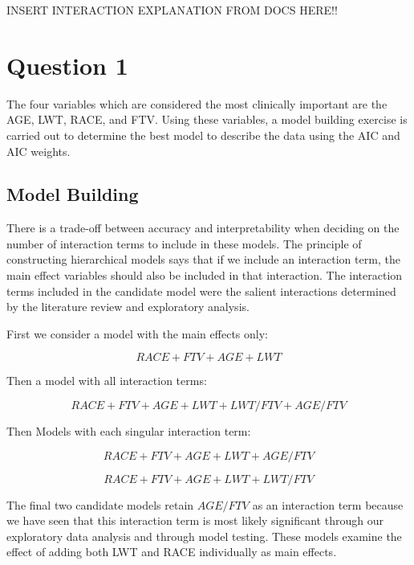 INSERT INTERACTION EXPLANATION FROM DOCS HERE!!

\section{Question 1}
The four variables which are considered the most clinically important are the AGE, LWT, RACE, and FTV. Using these variables, a model building exercise is carried out to determine the best model to describe the data using the AIC and AIC weights.

\subsection{Model Building} \label{BuildingOne}
There is a trade-off between accuracy and interpretability when deciding on the number of interaction terms to include in these models. The principle of constructing hierarchical models says that if we include an interaction term, the main effect variables should also be included in that interaction. The interaction terms included in the candidate model were the salient interactions determined by the literature review and exploratory analysis. 

First we consider a model with the main effects only:

\begin{equation}
    RACE + FTV + AGE + LWT
\end{equation}

Then a model with all interaction terms:

\begin{equation}
\label{eq:FullModel}
    RACE + FTV + AGE + LWT + LWT/FTV + AGE/FTV
\end{equation}

Then Models with each singular interaction term:

\begin{equation}
    RACE + FTV + AGE + LWT + AGE/FTV
\end{equation}

\begin{equation}
    RACE + FTV + AGE + LWT + LWT/FTV
\end{equation}

The final two candidate models retain $AGE/FTV$ as an interaction term because we have seen that this interaction term is most likely significant through our exploratory data analysis and through model testing. These models examine the effect of adding both LWT and RACE individually as main effects.

